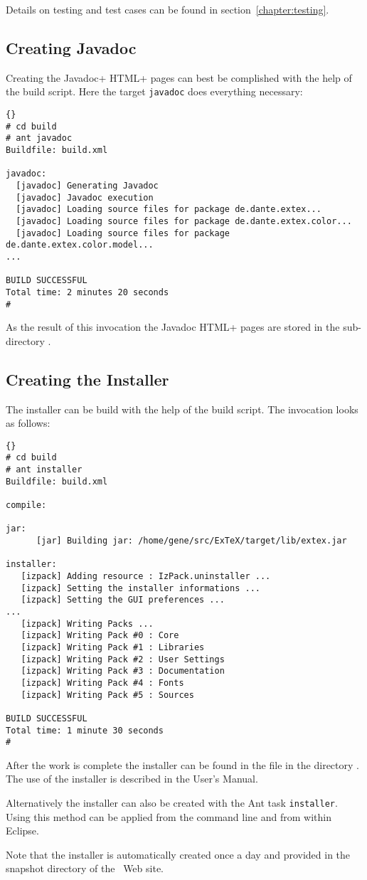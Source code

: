 Details on testing and test cases can be found in
section~\ref{chapter:testing}.

\subsection{Creating Javadoc}\label{sec:shell-javadoc}

Creating the \+Javadoc+ \+HTML+ pages can best be complished with the
help of the build script. Here the target \texttt{javadoc} does
everything necessary:

\begin{lstlisting}{}
# cd build
# ant javadoc
Buildfile: build.xml

javadoc:
  [javadoc] Generating Javadoc
  [javadoc] Javadoc execution
  [javadoc] Loading source files for package de.dante.extex...
  [javadoc] Loading source files for package de.dante.extex.color...
  [javadoc] Loading source files for package de.dante.extex.color.model...
...

BUILD SUCCESSFUL
Total time: 2 minutes 20 seconds
#
\end{lstlisting}{}

As the result of this invocation the Javadoc \+HTML+ pages are stored in
the sub-directory .


\subsection{Creating the Installer}\label{sec:shell-installer}

The installer can be build with the help of the build script. The
invocation looks as follows:

\begin{lstlisting}{}
# cd build
# ant installer
Buildfile: build.xml

compile:

jar:
      [jar] Building jar: /home/gene/src/ExTeX/target/lib/extex.jar

installer:
   [izpack] Adding resource : IzPack.uninstaller ...
   [izpack] Setting the installer informations ...
   [izpack] Setting the GUI preferences ...
... 
   [izpack] Writing Packs ...
   [izpack] Writing Pack #0 : Core
   [izpack] Writing Pack #1 : Libraries
   [izpack] Writing Pack #2 : User Settings
   [izpack] Writing Pack #3 : Documentation
   [izpack] Writing Pack #4 : Fonts
   [izpack] Writing Pack #5 : Sources

BUILD SUCCESSFUL
Total time: 1 minute 30 seconds
#
\end{lstlisting}{}

After the work is complete the installer can be found in the file
 in the directory . The use of the
installer is described in the User's Manual.

Alternatively the installer can also be created with the Ant task
\texttt{installer}. Using this method can be applied from the command
line and from within Eclipse.

Note that the installer is automatically created once a day and
provided in the snapshot directory of the \ExTeX\ Web site.

